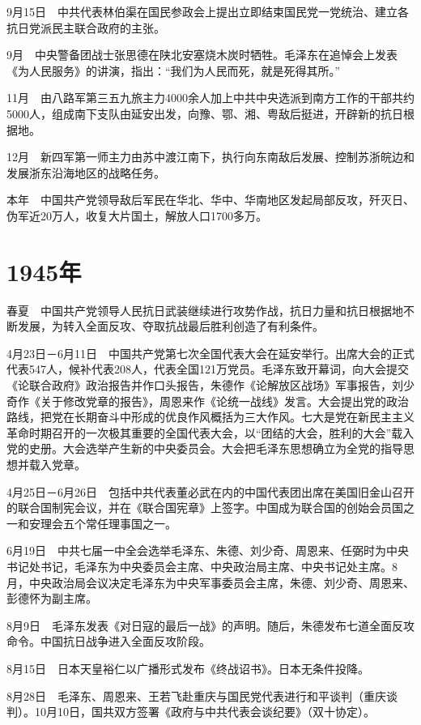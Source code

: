 \documentclass[10pt,a4paper,twocolumn]{book}
\begin{document}
9月15日　中共代表林伯渠在国民参政会上提出立即结束国民党一党统治、建立各抗日党派民主联合政府的主张。

9月　中央警备团战士张思德在陕北安塞烧木炭时牺牲。毛泽东在追悼会上发表《为人民服务》的讲演，指出：“我们为人民而死，就是死得其所。”

11月　由八路军第三五九旅主力4000余人加上中共中央选派到南方工作的干部共约5000人，组成南下支队由延安出发，向豫、鄂、湘、粤敌后挺进，开辟新的抗日根据地。

12月　新四军第一师主力由苏中渡江南下，执行向东南敌后发展、控制苏浙皖边和发展浙东沿海地区的战略任务。

本年　中国共产党领导敌后军民在华北、华中、华南地区发起局部反攻，歼灭日、伪军近20万人，收复大片国土，解放人口1700多万。

\section{1945年}

春夏　中国共产党领导人民抗日武装继续进行攻势作战，抗日力量和抗日根据地不断发展，为转入全面反攻、夺取抗战最后胜利创造了有利条件。

4月23日－6月11日　中国共产党第七次全国代表大会在延安举行。出席大会的正式代表547人，候补代表208人，代表全国121万党员。毛泽东致开幕词，向大会提交《论联合政府》政治报告并作口头报告，朱德作《论解放区战场》军事报告，刘少奇作《关于修改党章的报告》，周恩来作《论统一战线》发言。大会提出党的政治路线，把党在长期奋斗中形成的优良作风概括为三大作风。七大是党在新民主主义革命时期召开的一次极其重要的全国代表大会，以“团结的大会，胜利的大会”载入党的史册。大会选举产生新的中央委员会。大会把毛泽东思想确立为全党的指导思想并载入党章。

4月25日－6月26日　包括中共代表董必武在内的中国代表团出席在美国旧金山召开的联合国制宪会议，并在《联合国宪章》上签字。中国成为联合国的创始会员国之一和安理会五个常任理事国之一。

6月19日　中共七届一中全会选举毛泽东、朱德、刘少奇、周恩来、任弼时为中央书记处书记，毛泽东为中央委员会主席、中央政治局主席、中央书记处主席。8月，中央政治局会议决定毛泽东为中央军事委员会主席，朱德、刘少奇、周恩来、彭德怀为副主席。

8月9日　毛泽东发表《对日寇的最后一战》的声明。随后，朱德发布七道全面反攻命令。中国抗日战争进入全面反攻阶段。

8月15日　日本天皇裕仁以广播形式发布《终战诏书》。日本无条件投降。

8月28日　毛泽东、周恩来、王若飞赴重庆与国民党代表进行和平谈判（重庆谈判）。10月10日，国共双方签署《政府与中共代表会谈纪要》（双十协定）。
\end{document}

